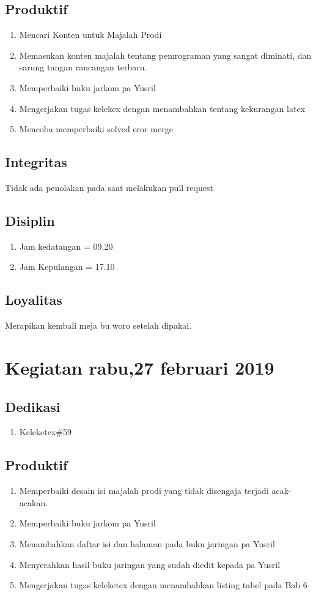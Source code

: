 \subsection{Produktif}
\begin{enumerate}
\item Mencari Konten untuk Majalah Prodi
\item Memasukan konten majalah tentang pemrograman yang sangat diminati, dan sarung tangan rancangan terbaru.
\item Memperbaiki buku jarkom pa Yusril
\item Mengerjakan tugas kelekex dengan menambahkan tentang kekurangan latex
\item Mencoba memperbaiki solved eror merge
\end{enumerate}
\subsection{Integritas}
Tidak ada penolakan pada saat melakukan pull request
\subsection{Disiplin}
\begin{enumerate}
\item Jam kedatangan = 09.20
\item Jam Kepulangan = 17.10
\end{enumerate}
\subsection{Loyalitas}
Merapikan kembali meja bu woro setelah dipakai.


\section{ Kegiatan rabu,27 februari 2019}
\subsection{Dedikasi}
\begin{enumerate}
\item Keleketex\#59
\end{enumerate}
\subsection{Produktif}
\begin{enumerate}
\item Memperbaiki desain isi majalah prodi yang tidak disengaja terjadi acak-acakan.
\item Memperbaiki buku jarkom pa Yusril
\item Menambahkan daftar isi dan halaman pada buku jaringan pa Yusril
\item Menyerahkan hasil buku jaringan yang sudah diedit kepada pa Yusril
\item Mengerjakan tugas keleketex dengan menambahkan listing tabel pada Bab 6
\end{enumerate}
